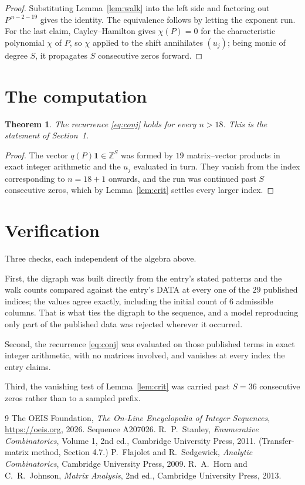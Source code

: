 \documentclass[11pt,a4paper]{article}
\theoremstyle{plain}
\newtheorem{theorem}{Theorem}
\theoremstyle{definition}
\begin{document}
\begin{proof}
Substituting Lemma~\ref{lem:walk} into the left side and factoring out
$P^{\,n-2-19}$ gives the identity. The equivalence follows by letting the exponent
run. For the last claim, Cayley--Hamilton gives $\chi(P)=0$ for the characteristic
polynomial $\chi$ of $P$, so $\chi$ applied to the shift annihilates $(u_j)$; being monic of
degree $S$, it propagates $S$ consecutive zeros forward.
\end{proof}

\section{The computation}

\begin{theorem}
The recurrence \eqref{eq:conj} holds for every $n>18$. This is the statement of
Section~1.
\end{theorem}

\begin{proof}
The vector $q(P)\mathbf{1}\in\mathbb{Z}^{S}$ was formed by $19$ matrix--vector
products in exact integer arithmetic and the $u_j$ evaluated in turn. They vanish from the
index corresponding to $n=18+1$ onwards, and the run was continued past $S$ consecutive
zeros, which by Lemma~\ref{lem:crit} settles every larger index.
\end{proof}

\section{Verification}

Three checks, each independent of the algebra above.

First, the digraph was built directly from the entry's stated patterns and the walk counts
compared against the entry's DATA at every one of the $29$ published indices; the
values agree exactly, including the initial count of $6$ admissible columns. That is
what ties the digraph to the sequence, and a model reproducing only part of the published
data was rejected wherever it occurred.

Second, the recurrence \eqref{eq:conj} was evaluated on those published terms in exact
integer arithmetic, with no matrices involved, and vanishes at every index the entry claims.

Third, the vanishing test of Lemma~\ref{lem:crit} was carried past $S=36$ consecutive
zeros rather than to a sampled prefix.

\begin{thebibliography}{9}
 The OEIS Foundation, \emph{The On-Line Encyclopedia of Integer
Sequences}, \url{https://oeis.org}, 2026. Sequence A207026.
 R.~P.~Stanley, \emph{Enumerative Combinatorics}, Volume 1, 2nd ed.,
Cambridge University Press, 2011. (Transfer-matrix method, Section 4.7.)
 P.~Flajolet and R.~Sedgewick, \emph{Analytic Combinatorics}, Cambridge
University Press, 2009.
 R.~A.~Horn and C.~R.~Johnson, \emph{Matrix Analysis}, 2nd ed., Cambridge
University Press, 2013.
\end{thebibliography}
\end{document}
